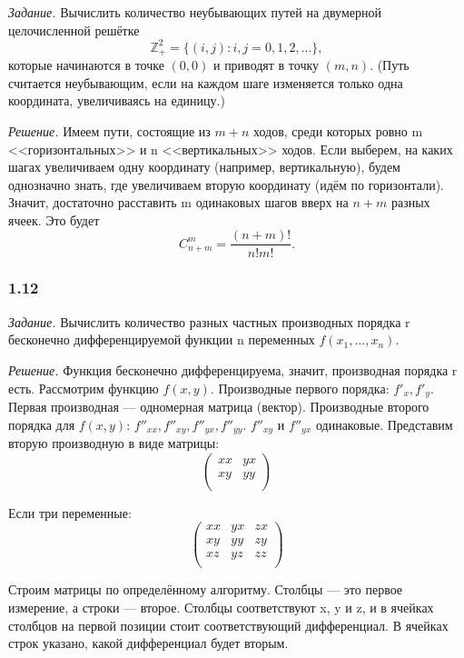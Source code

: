 \documentclass{book}
\begin{document}
\textit{Задание.} Вычислить количество неубывающих путей на двумерной целочисленной решётке $$\mathbb{Z}_+^2=\{\left(i, j\right): i, j=0, 1, 2, ...\},$$ которые начинаются в точке $\left(0, 0\right)$ и приводят в точку $\left(m, n\right)$. (Путь считается неубывающим, если на каждом шаге изменяется только одна координата, увеличиваясь на единицу.)

\textit{Решение.} Имеем пути, состоящие из $m+n$ ходов, среди которых ровно m <<горизонтальных>> и n <<вертикальных>> ходов. Если выберем, на каких шагах увеличиваем одну координату (например, вертикальную), будем однозначно знать, где увеличиваем вторую координату (идём по горизонтали). Значит, достаточно расставить m одинаковых шагов вверх на $n+m$ разных ячеек. Это будет $$C_{n+m}^m=\frac{\left(n+m\right)!}{n!m!}.$$

\subsubsection*{1.12}

\textit{Задание.} Вычислить количество разных частных производных порядка r бесконечно дифференцируемой функции n переменных $f\left(x_1, ..., x_n\right)$.

\textit{Решение.} Функция бесконечно дифференцируема, значит, производная порядка r есть. Рассмотрим функцию $f(x, y)$. Производные первого порядка: $f'_x, f'_y$. Первая производная --- одномерная матрица (вектор). Производные второго порядка для $f(x, y)$: $f''_{xx}, f''_{xy}, f''_{yx}, f''_{yy}$. $f''_{xy}$ и $f''_{yx}$ одинаковые. Представим вторую производную в виде матрицы:
$$
\begin{pmatrix}
  xx & yx \\
  xy & yy \\ 
\end{pmatrix}
$$

Если три переменные:
$$
\begin{pmatrix}
  xx & yx & zx \\
  xy & yy & zy \\
  xz & yz & zz \\ 
\end{pmatrix}
$$

Строим матрицы по определённому алгоритму. Столбцы --- это первое измерение, а строки --- второе. Столбцы соответствуют x, y и z, и в ячейках столбцов на первой позиции стоит соответствующий дифференциал. В ячейках строк указано, какой дифференциал будет вторым.
\end{document}
